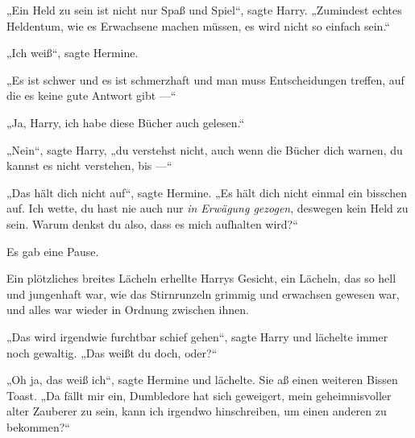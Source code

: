 „Ein Held zu sein ist nicht nur Spaß und Spiel“, sagte Harry.
„Zumindest echtes Heldentum, wie es Erwachsene machen müssen, es wird nicht so einfach sein.“

„Ich weiß“, sagte Hermine.

„Es ist schwer und es ist schmerzhaft und man muss Entscheidungen treffen, auf die es keine gute Antwort gibt —“

„Ja, Harry, ich habe diese Bücher auch gelesen.“

„Nein“, sagte Harry, „du verstehst nicht, auch wenn die Bücher dich warnen, du kannst es nicht verstehen, bis —“

„Das hält dich nicht auf“, sagte Hermine.
„Es hält dich nicht einmal ein bisschen auf. Ich wette, du hast nie auch nur \emph{in Erwägung gezogen}, deswegen kein Held zu sein. Warum denkst du also, dass es mich aufhalten wird?“

Es gab eine Pause.

Ein plötzliches breites Lächeln erhellte Harrys Gesicht, ein Lächeln, das so hell und jungenhaft war, wie das Stirnrunzeln grimmig und erwachsen gewesen war, und alles war wieder in Ordnung zwischen ihnen.

„Das wird irgendwie furchtbar schief gehen“, sagte Harry und lächelte immer noch gewaltig.
„Das weißt du doch, oder?“

„Oh ja, das weiß ich“, sagte Hermine und lächelte. Sie aß einen weiteren Bissen Toast.
„Da fällt mir ein, Dumbledore hat sich geweigert, mein geheimnisvoller alter Zauberer zu sein, kann ich irgendwo hinschreiben, um einen anderen zu bekommen?“


